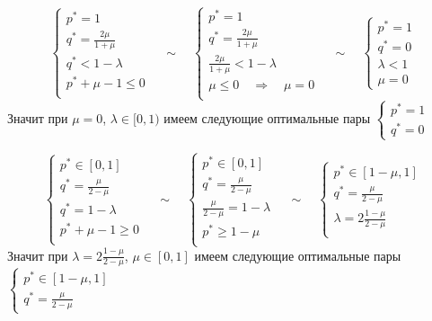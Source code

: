 \[
\begin{cases}
p^{*}=1 \\
q^{*}=\frac{2\mu}{1+\mu} \\
q^{*}<1-\lambda \\
p^{*}+\mu-1 \leq 0 \\
\end{cases}
\quad\sim\quad
\begin{cases}
p^{*}=1 \\
q^{*}=\frac{2\mu}{1+\mu} \\
\frac{2\mu}{1+\mu}<1-\lambda \\
\mu \leq 0 \quad\Rightarrow\quad \mu=0 \\
\end{cases}
\quad\sim\quad
\begin{cases}
p^{*}=1 \\
q^{*}=0 \\
\lambda<1 \\
\mu=0
\end{cases}
\]
Значит при $\mu=0$, $\lambda \in [0, 1)$ имеем следующие оптимальные пары
$\begin{cases}p^{*}=1 \\ q^{*}=0 \end{cases}$


\[
\begin{cases}
p^{*} \in [0, 1] \\
q^{*}=\frac{\mu}{2-\mu} \\
q^{*}=1-\lambda \\
p^{*}+\mu-1 \geq 0 \\
\end{cases}
\quad\sim\quad
\begin{cases}
p^{*} \in [0, 1] \\
q^{*}=\frac{\mu}{2-\mu} \\
\frac{\mu}{2-\mu}=1-\lambda \\
p^* \geq 1-\mu \\
\end{cases}
\quad\sim\quad
\begin{cases}
p^* \in [1-\mu, 1] \\
q^{*}=\frac{\mu}{2-\mu} \\
\lambda=2\frac{1-\mu}{2-\mu} \\
\end{cases}
\]
Значит при $\lambda=2\frac{1-\mu}{2-\mu}$, $\mu \in [0, 1]$ имеем следующие оптимальные пары
$\begin{cases}p^{*} \in [1-\mu, 1] \\ q^{*}=\frac{\mu}{2-\mu} \end{cases}$



